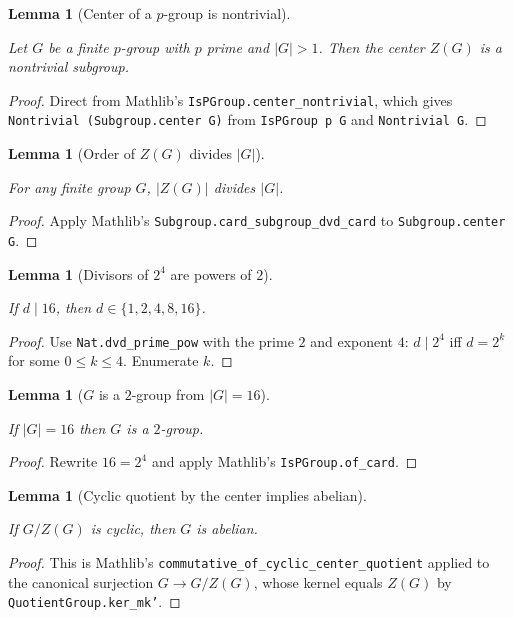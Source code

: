 \documentclass{article}
\newtheorem{lemma}[theorem]{Lemma}
\theoremstyle{definition}
\newcommand{\lean}[1]{}
\newcommand{\leanok}{}
\newcommand{\leanfile}[1]{}
\begin{document}
\begin{lemma}[Center of a $p$-group is nontrivial]
    \label{lem:pgroup-center-nontrivial}
    \lean{OrderSixteen.Prelim.pgroup_center_nontrivial}
    \leanfile{M2rGroup7/SixteenCase.lean}
    \leanok
    Let $G$ be a finite $p$-group with $p$ prime and $|G| > 1$. Then the
    center $Z(G)$ is a nontrivial subgroup.
\end{lemma}
\begin{proof}
    Direct from Mathlib's \texttt{IsPGroup.center\_nontrivial}, which gives
    \texttt{Nontrivial (Subgroup.center G)} from \texttt{IsPGroup p G} and
    \texttt{Nontrivial G}.
\end{proof}

\begin{lemma}[Order of $Z(G)$ divides $|G|$]
    \label{thm:center-divides-card}
    \lean{OrderSixteen.Prelim.center_divides_card}
    \leanfile{M2rGroup7/SixteenCase.lean}
    \leanok
    For any finite group $G$, $|Z(G)|$ divides $|G|$.
\end{lemma}
\begin{proof}
    Apply Mathlib's \texttt{Subgroup.card\_subgroup\_dvd\_card} to
    \texttt{Subgroup.center G}.
\end{proof}

\begin{lemma}[Divisors of $2^4$ are powers of $2$]
    \label{lem:two-power-divisors}
    \lean{OrderSixteen.Prelim.two_power_divisors}
    \leanfile{M2rGroup7/SixteenCase.lean}
    \leanok
    If $d \mid 16$, then $d \in \{1,2,4,8,16\}$.
\end{lemma}
\begin{proof}
    Use \texttt{Nat.dvd\_prime\_pow} with the prime $2$ and exponent $4$:
    $d \mid 2^4$ iff $d = 2^k$ for some $0 \le k \le 4$. Enumerate $k$.
\end{proof}

\begin{lemma}[$G$ is a $2$-group from $|G| = 16$]
    \label{lem:pgroup-of-card-sixteen}
    \lean{OrderSixteen.Prelim.pgroup_of_card_sixteen}
    \leanfile{M2rGroup7/SixteenCase.lean}
    \leanok
    If $|G| = 16$ then $G$ is a $2$-group.
\end{lemma}
\begin{proof}
    Rewrite $16 = 2^4$ and apply Mathlib's \texttt{IsPGroup.of\_card}.
\end{proof}

\begin{lemma}[Cyclic quotient by the center implies abelian]
    \label{lem:cyclic-center-quotient-abelian}
    \lean{OrderSixteen.Prelim.cyclic_center_quotient_abelian}
    \leanfile{M2rGroup7/SixteenCase.lean}
    \leanok
    If $G/Z(G)$ is cyclic, then $G$ is abelian.
\end{lemma}
\begin{proof}
    This is Mathlib's \texttt{commutative\_of\_cyclic\_center\_quotient}
    applied to the canonical surjection $G \to G/Z(G)$, whose kernel equals
    $Z(G)$ by \texttt{QuotientGroup.ker\_mk'}.
\end{proof}
\end{document}
